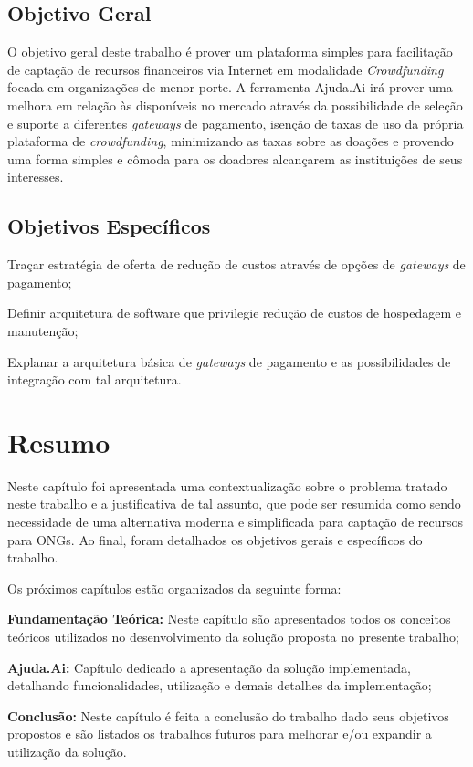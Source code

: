 \subsection{Objetivo Geral}
O objetivo geral deste trabalho é prover um plataforma simples para facilitação de captação de recursos financeiros via Internet em modalidade \emph{Crowdfunding} focada em organizações de menor porte. A ferramenta Ajuda.Ai irá prover uma melhora em relação às disponíveis no mercado através da possibilidade de seleção e suporte a diferentes \emph{gateways} de pagamento, isenção de taxas de uso da própria plataforma de \emph{crowdfunding}, minimizando as taxas sobre as doações e provendo uma forma simples e cômoda para os doadores alcançarem as instituições de seus interesses.



\subsection{Objetivos Específicos}
\begin{lista}
  \item Traçar estratégia de oferta de redução de custos através de opções de \emph{gateways} de pagamento;
  \item Definir arquitetura de software que privilegie redução de custos de hospedagem e manutenção;
  \item Explanar a arquitetura básica de \emph{gateways} de pagamento e as possibilidades de integração com tal arquitetura.
\end{lista}



\section*{Resumo}
Neste capítulo foi apresentada uma contextualização sobre o problema tratado neste trabalho e a justificativa de tal assunto, que pode ser resumida como sendo necessidade de uma alternativa moderna e simplificada para captação de recursos para ONGs. Ao final, foram detalhados os objetivos gerais e específicos do trabalho.

Os próximos capítulos estão organizados da seguinte forma:

\begin{lista}
  \item \textbf{Fundamentação Teórica:} Neste capítulo são apresentados todos os conceitos teóricos utilizados no desenvolvimento da solução proposta no presente trabalho;
  \item \textbf{Ajuda.Ai:} Capítulo dedicado a apresentação da solução implementada, detalhando funcionalidades, utilização e demais detalhes da implementação;
  \item \textbf{Conclusão:} Neste capítulo é feita a conclusão do trabalho dado seus objetivos propostos e são listados os trabalhos futuros para melhorar e/ou expandir a utilização da solução.
\end{lista}
